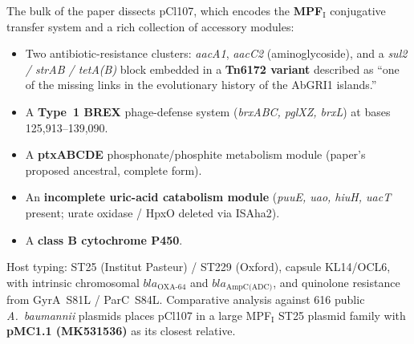 \documentclass[11pt]{article}
\begin{document}
The bulk of the paper dissects pCl107, which encodes the \textbf{MPF$_\mathrm{I}$} conjugative transfer system and a rich collection of accessory modules:
\begin{itemize}
  \item Two antibiotic-resistance clusters: \textit{aacA1}, \textit{aacC2} (aminoglycoside), and a \textit{sul2 / strAB / tetA(B)} block embedded in a \textbf{Tn6172 variant} described as ``one of the missing links in the evolutionary history of the AbGRI1 islands.''
  \item A \textbf{Type~1 BREX} phage-defense system (\textit{brxABC, pglXZ, brxL}) at bases 125{,}913--139{,}090.
  \item A \textbf{ptxABCDE} phosphonate/phosphite metabolism module (paper's proposed ancestral, complete form).
  \item An \textbf{incomplete uric-acid catabolism module} (\textit{puuE, uao, hiuH, uacT} present; urate oxidase / HpxO deleted via ISAha2).
  \item A \textbf{class B cytochrome P450}.
\end{itemize}
Host typing: ST25 (Institut Pasteur) / ST229 (Oxford), capsule KL14/OCL6, with intrinsic chromosomal $bla_{\text{OXA-64}}$ and $bla_{\text{AmpC(ADC)}}$, and quinolone resistance from GyrA~S81L / ParC~S84L. Comparative analysis against 616 public \textit{A.~baumannii} plasmids places pCl107 in a large MPF$_\mathrm{I}$ ST25 plasmid family with \textbf{pMC1.1 (MK531536)} as its closest relative.
\end{document}
